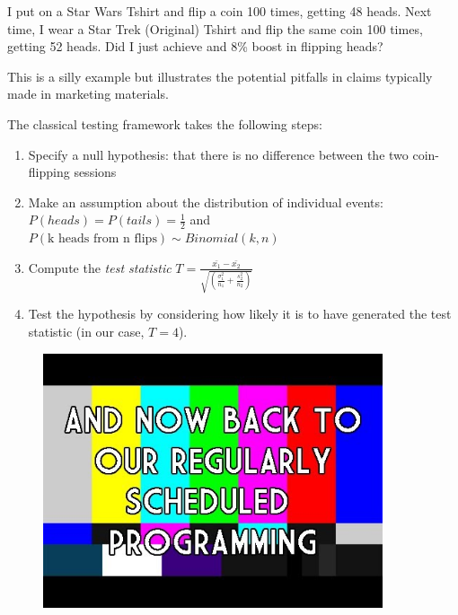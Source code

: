\documentclass[]{beamer}
\theoremstyle{definition}
\begin{document}
\begin{frame}
	\begin{example}
	I put on a Star Wars Tshirt and flip a coin 100 times, getting 48 heads.  Next time, I wear a Star Trek (Original) Tshirt and flip the same coin 100 times, getting 52 heads.  Did I just achieve and 8\% boost in flipping heads?
	\end{example}\pause
	This is a silly example but illustrates the potential pitfalls in claims typically made in marketing materials.
\end{frame}


\begin{frame}	
	The classical testing framework takes the following steps:
	\begin{enumerate}
	\item Specify a null hypothesis: that there is no difference between the two coin-flipping sessions
	\item Make an assumption about the distribution of individual events: $P(heads) = P(tails) = \frac{1}{2}$ and $P(\text{k heads from n flips}) \sim Binomial(k, n)$
	\item Compute the \emph{test statistic} $T = \frac{\bar{x_1} - \bar{x_2}}{\sqrt{(\frac{\sigma_1^2}{n_1} + \frac{s_2^2}{n_2})}}$
	\item Test the hypothesis by considering how likely it is to have generated the test statistic (in our case, $T = 4$).
	\end{enumerate}
	\pause
\end{frame}

\begin{frame}
	\begin{figure}[ht!]
  		\centering
		\includegraphics[height=7.5cm]{resources/scheduled_program.jpg}
	\end{figure}
\end{frame}
\end{document}
